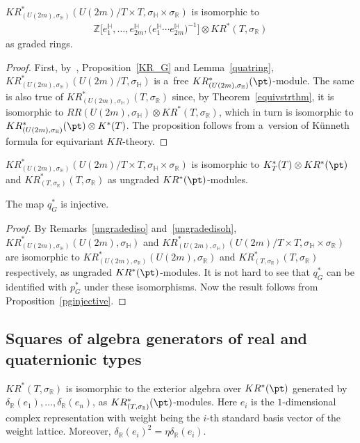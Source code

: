 \begin{Proposition}
$KR_{(U(2m),
\sigma_\mathbb{H})}^*(U(2m)/T\times T,
\sigma_\mathbb{H}
\times
\sigma_\mathbb{R})$ is isomorphic to
\begin{gather*}
\mathbb{Z}\big[e_1^\mathbb{H}, \dots, e_{2m}^\mathbb{H},
\big(e_1^\mathbb{H}\cdots e_{2m}^\mathbb{H}\big)^{-1}\big]
\otimes KR^*(T,\sigma_\mathbb{R})
\end{gather*}
as graded rings.
\end{Proposition}
\begin{proof}
First, by~\cite[Theorem~1]{P}, Proposition~\ref{KR_G} and Lemma~\ref{quatring}, $KR^*_{(U(2m),
\sigma_\mathbb{H})}(U(2m)/T,
\sigma_\mathbb{H})$ is a~free $KR_{(U(2m),
\sigma_\mathbb{H})}^*(\pt)$-module.
The same is also true of $KR_{(U(2m),
\sigma_\mathbb{H})}^*(T,
\sigma_\mathbb{R})$ since, by Theo\-rem~\ref{equivstrthm}, it is isomorphic to $RR(U(2m),
\sigma_\mathbb{H})\otimes KR^*(T,
\sigma_\mathbb{R})$, which in turn is isomorphic to $KR^*_{(U(2m),
\sigma_\mathbb{H})}(\pt)\otimes K^*(T)$.
The proposition
follows from a~version of K\"unneth formula for equivariant $KR$-theory.
\end{proof}
\begin{Remark}
\label{ungradedisoh}
$KR^*_{(U(2m),
\sigma_\mathbb{H})}(U(2m)/T\times T,
\sigma_\mathbb{H}
\times
\sigma_\mathbb{R})$ is isomorphic to $K^*_T(T)\otimes KR^*(\pt)$ and $KR^*_{(T,
\sigma_\mathbb{R})}(T,
\sigma_\mathbb{R})$ as ungraded $KR^*(\pt)$-modules.
\end{Remark}
\begin{Proposition}
\label{qginjective}
The map $q_G^*$ is injective.
\end{Proposition}
\begin{proof}
By Remarks~\ref{ungradediso} and~\ref{ungradedisoh}, $KR^*_{(U(2m),
\sigma_\mathbb{H})}(U(2m),
\sigma_\mathbb{H})$ and $KR^*_{(U(2m),
\sigma_\mathbb{H})}(U(2m)/T\times T,
\sigma_\mathbb{H}
\times
\sigma_\mathbb{R})$ are isomorphic to $KR^*_{(U(2m),
\sigma_\mathbb{R})}(U(2m),
\sigma_\mathbb{R})$ and $KR^*_{(T,
\sigma_\mathbb{R})}(T,
\sigma_\mathbb{R})$ respectively, as ungraded $KR^*(\pt)$-modules.
It is not hard to see that $q_G^*$ can be identif\/ied with $p_G^*$ under these isomorphisms.
Now the result follows from Proposition~\ref{pginjective}.
\end{proof}
\subsection{Squares of algebra generators of real and quaternionic types}
\begin{Lemma}
\label{eqkrthytorus}
$KR^*(T,
\sigma_\mathbb{R})$ is isomorphic to the exterior algebra over $KR^*(\pt)$ generated by $\delta_\mathbb{R}(e_1), \dots,
\delta_\mathbb{R}(e_n)$, as $KR^*_{(T,
\sigma_\mathbb{R})}(\pt)$-modules.
Here $e_i$ is the $1$-dimensional complex representation with weight being the $i$-th standard basis vector of the weight
lattice.
Moreover, $\delta_\mathbb{R}(e_i)^2=\eta\delta_\mathbb{R}(e_i)$.
\end{Lemma}


